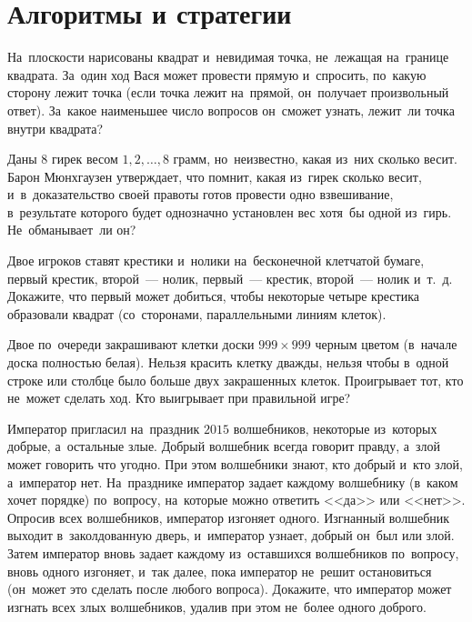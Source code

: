 
\section*{Алгоритмы и стратегии}


\begin{problems}

\item
На~плоскости нарисованы квадрат и~невидимая точка, не~лежащая на~границе
квадрата.
За~один ход Вася может провести прямую и~спросить, по~какую сторону лежит точка
(если точка лежит на~прямой, он~получает произвольный ответ).
За~какое наименьшее число вопросов он~сможет узнать, лежит~ли точка внутри
квадрата?

\item
Даны 8 гирек весом $1, 2, \ldots, 8$ грамм, но~неизвестно, какая из~них
сколько весит.
Барон Мюнхгаузен утверждает, что помнит, какая из~гирек сколько весит,
и~в~доказательство своей правоты готов провести одно взвешивание, в~результате
которого будет однозначно установлен вес хотя~бы одной из~гирь.
Не~обманывает~ли он?

\item
Двое игроков ставят крестики и~нолики на~бесконечной клетчатой бумаге, первый
крестик, второй~--- нолик, первый~--- крестик, второй~--- нолик и~т.~д.
Докажите, что первый может добиться, чтобы некоторые четыре крестика образовали
квадрат (со~сторонами, параллельными линиям клеток).

\item
Двое по~очереди закрашивают клетки доски $999 \times 999$ черным цветом
(в~начале доска полностью белая).
Нельзя красить клетку дважды, нельзя чтобы в~одной строке или столбце было
больше двух закрашенных клеток.
Проигрывает тот, кто не~может сделать ход.
Кто выигрывает при правильной игре?

\item
Император пригласил на~праздник $2015$ волшебников, некоторые из~которых
добрые, а~остальные злые.
Добрый волшебник всегда говорит правду, а~злой может говорить что угодно.
При этом волшебники знают, кто добрый и~кто злой, а~император нет.
На~празднике император задает каждому волшебнику (в~каком хочет порядке)
по~вопросу, на~которые можно ответить <<да>> или <<нет>>.
Опросив всех волшебников, император изгоняет одного.
Изгнанный волшебник выходит в~заколдованную дверь, и~император узнает, добрый
он~был или злой.
Затем император вновь задает каждому из~оставшихся волшебников по~вопросу,
вновь одного изгоняет, и~так далее, пока император не~решит остановиться
(он~может это сделать после любого вопроса).
Докажите, что император может изгнать всех злых волшебников, удалив при этом
не~более одного доброго.


\end{problems}
